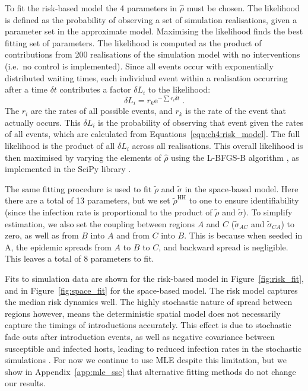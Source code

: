 To fit the risk-based model the 4 parameters in $\hat{\rho}$ must be chosen. The likelihood is defined as the probability of observing a set of simulation realisations, given a parameter set in the approximate model. Maximising the likelihood finds the best fitting set of parameters. The likelihood is computed as the product of contributions from 200 realisations of the simulation model with no interventions (i.e.\ no control is implemented). Since all events occur with exponentially distributed waiting times, each individual event within a realisation occurring after a time $\delta{}t$ contributes a factor $\delta{}L_i$ to the likelihood:
\begin{equation}
\delta{}L_i = r_k\mathrm{e}^{-\sum{}r_i\delta{}t}\;.
\end{equation}
The $r_i$ are the rates of all possible events, and $r_k$ is the rate of the event that actually occurs. This $\delta{}L_i$ is the probability of observing that event given the rates of all events, which are calculated from Equations~\ref{eqn:ch4:risk_model}. The full likelihood is the product of all $\delta{}L_i$ across all realisations. This overall likelihood is then maximised by varying the elements of $\hat{\rho}$ using the L-BFGS-B algorithm \citep{byrd_limited_1995}, as implemented in the SciPy library \citep{scipy}.

The same fitting procedure is used to fit $\tilde{\rho}$ and $\tilde{\sigma}$ in the space-based model. Here there are a total of 13 parameters, but we set $\tilde{\rho}^\mathrm{HH}$ to one to ensure identifiability (since the infection rate is proportional to the product of $\tilde{\rho}$ and $\tilde{\sigma}$). To simplify estimation, we also set the coupling between regions $A$ and $C$ ($\tilde{\sigma}_{AC}$ and $\tilde{\sigma}_{CA}$) to zero, as well as from $B$ into $A$ and from $C$ into $B$. This is because when seeded in A, the epidemic spreads from $A$ to $B$ to $C$, and backward spread is negligible. This leaves a total of 8 parameters to fit.

Fits to simulation data are shown for the risk-based model in Figure~\ref{fig:risk_fit}, and in Figure~\ref{fig:space_fit} for the space-based model. The risk model captures the median risk dynamics well. The highly stochastic nature of spread between regions however, means the deterministic spatial model does not necessarily capture the timings of introductions accurately. This effect is due to stochastic fade outs after introduction events, as well as negative covariance between susceptible and infected hosts, leading to reduced infection rates in the stochastic simulations \citep[pp.~227--229 and pp.~238--240]{keeling_modeling_2008}. For now we continue to use MLE despite this limitation, but we show in Appendix~\ref{app:mle_sse} that alternative fitting methods do not change our results.

